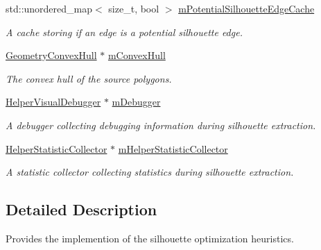 \begin{DoxyCompactItemize}
std\+::unordered\+\_\+map$<$ size\+\_\+t, bool $>$ \mbox{\hyperlink{classvisilib_1_1_silhouette_processor_ae30799e77e708b67a60f8a7da98c8acf}{m\+Potential\+Silhouette\+Edge\+Cache}}
\begin{DoxyCompactList}\small\item\em A cache storing if an edge is a potential silhouette edge. \end{DoxyCompactList}\item 
\mbox{\label{classvisilib_1_1_silhouette_processor_ad773286df9b2d57c7ab53cb6fda1729d}} 
\mbox{\hyperlink{classvisilib_1_1_geometry_convex_hull}{Geometry\+Convex\+Hull}} $\ast$ \mbox{\hyperlink{classvisilib_1_1_silhouette_processor_ad773286df9b2d57c7ab53cb6fda1729d}{m\+Convex\+Hull}}
\begin{DoxyCompactList}\small\item\em The convex hull of the source polygons. \end{DoxyCompactList}\item 
\mbox{\label{classvisilib_1_1_silhouette_processor_a58e23d72915e7077fb6b7a05d9094c1a}} 
\mbox{\hyperlink{classvisilib_1_1_helper_visual_debugger}{Helper\+Visual\+Debugger}} $\ast$ \mbox{\hyperlink{classvisilib_1_1_silhouette_processor_a58e23d72915e7077fb6b7a05d9094c1a}{m\+Debugger}}
\begin{DoxyCompactList}\small\item\em A debugger collecting debugging information during silhouette extraction. \end{DoxyCompactList}\item 
\mbox{\label{classvisilib_1_1_silhouette_processor_a2695d1a08aa11a3fa5308a7cb29f305f}} 
\mbox{\hyperlink{classvisilib_1_1_helper_statistic_collector}{Helper\+Statistic\+Collector}} $\ast$ \mbox{\hyperlink{classvisilib_1_1_silhouette_processor_a2695d1a08aa11a3fa5308a7cb29f305f}{m\+Helper\+Statistic\+Collector}}
\begin{DoxyCompactList}\small\item\em A statistic collector collecting statistics during silhouette extraction. \end{DoxyCompactList}\end{DoxyCompactItemize}


\subsection{Detailed Description}
Provides the implemention of the silhouette optimization heuristics. 

